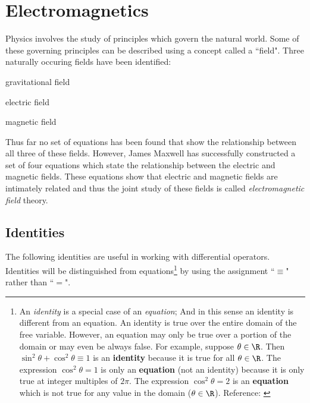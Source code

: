 
\chapter{Electromagnetics}
\label{app:em}
Physics involves the study of principles which govern the natural world.
Some of these governing principles can be described using a concept called a ``field".
Three naturally occuring fields have been identified:
\begin{liste}
   \item gravitational field
   \item electric field
   \item magnetic field
\end{liste}

Thus far no set of equations has been found
that show the relationship between all three of these fields.
However, James Maxwell has successfully constructed a set of four equations which state the
relationship between the electric and magnetic fields.
These equations show that electric and magnetic fields are intimately related and thus
the joint study of these fields is called {\em electromagnetic field} theory.


\section{Identities}
The following identities
are useful in working with differential operators.
Identities will be distinguished from equations\footnote{
   An {\em identity} is a special case of an {\em equation};
   And in this sense an identity is different from an equation.
   An identity is true over the entire domain of the free variable.
   However, an equation may only be true over a portion of the domain or may even be always false.
   For example, suppose $\theta\in\R$.
   Then $\sin^2\theta + \cos^2\theta \equiv 1$ is an {\bf identity} because it is true for all $\theta\in\R$.
   The expression $\cos^2\theta=1$ is only an {\bf equation} (not an identity) because it is only true
   at integer multiples of $2\pi$.
   The expression $\cos^2\theta=2$ is an {\bf equation} which is not true for any value in the domain ($\theta\in\R$).
   Reference: \cite{smith}
   }
by using the assignment ``$\equiv$" rather than ``$=$".

